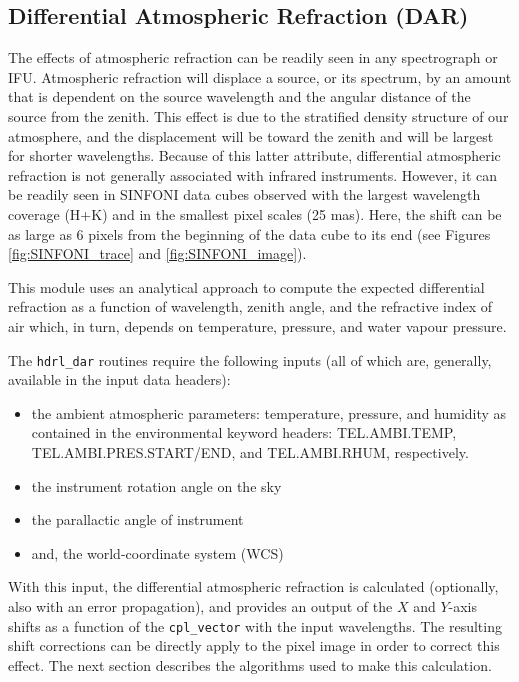 \subsection{Differential Atmospheric Refraction (DAR)}
\label{refraction:main}

The effects of atmospheric refraction can be readily seen in any spectrograph or IFU. Atmospheric refraction will displace a source, or its spectrum, 
by an amount that is dependent on the source wavelength and the angular distance of the source from the zenith.  
This effect is due to the stratified density structure of our atmosphere, and the displacement will be toward the zenith and will be largest for shorter wavelengths.
Because of this latter attribute, differential atmospheric refraction is not generally associated with infrared instruments. However, it can be 
readily seen in SINFONI data cubes observed with the largest wavelength coverage (H+K) and in the smallest pixel scales (25 mas). 
Here, the shift can be as large as 6 pixels from the beginning of the data cube to its end (see Figures \ref{fig:SINFONI_trace} and \ref{fig:SINFONI_image}).

This module uses an analytical approach to compute the expected differential refraction as a function of wavelength, zenith angle, and the refractive index of air
which, in turn, depends on temperature, pressure, and water vapour pressure.

The {\tt hdrl\_dar} routines require the following inputs (all of which are, generally, available in the input data headers):
\begin{itemize}
\item the ambient atmospheric parameters: temperature, pressure, and humidity as contained in the environmental keyword headers:
TEL.AMBI.TEMP, TEL.AMBI.PRES.START/END, and TEL.AMBI.RHUM, respectively.
\item the instrument rotation angle on the sky
\item the parallactic angle of instrument
\item and, the world-coordinate system (WCS)
\end{itemize}

With this input, the differential atmospheric refraction is calculated (optionally, also with an error propagation), and provides an output of the $X$ and $Y$-axis shifts as a function of the
\verb+cpl_vector+ with the input wavelengths.  The resulting shift corrections can be directly apply to the pixel image in order to correct this effect.
The next section describes the algorithms used to make this calculation.


